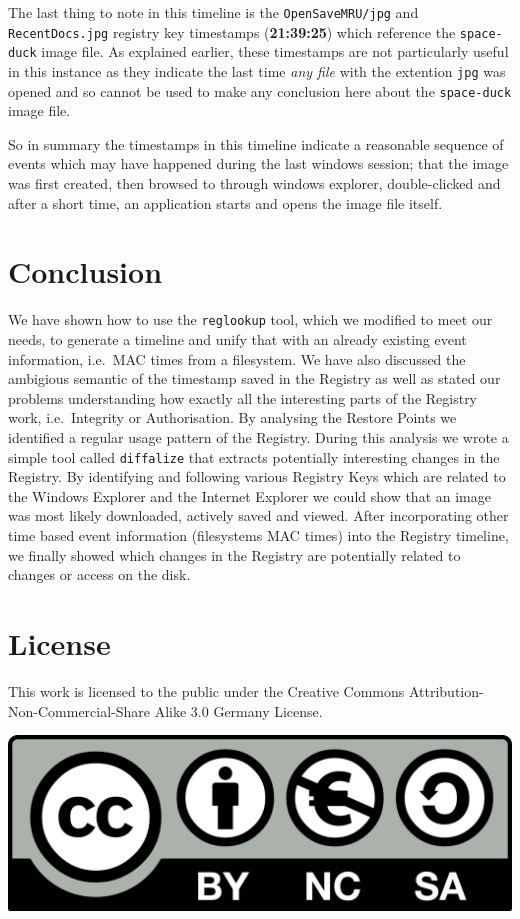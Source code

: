 \documentclass[a4paper,
    11pt,
    normalheadings,
    parindent,
    UKenglish,
    abstracton,
    ]{scrartcl}
\begin{document}
The last thing to note in this timeline is the \texttt{OpenSaveMRU/jpg} and \texttt{RecentDocs.jpg} registry key timestamps (\textbf{21:39:25}) which reference the \texttt{space-duck} image file.
As explained earlier, these timestamps are not particularly useful in this instance as they indicate the last time \emph{any file} with the extention \texttt{jpg} was opened and so cannot be used to make any conclusion here about the \texttt{space-duck} image file.

So in summary the timestamps in this timeline indicate a reasonable sequence of events which may have happened during the last windows session; that the image was first created, then browsed to through windows explorer, double-clicked and after a short time, an application starts and opens the image file itself.


\section{Conclusion}

We have shown how to use the \texttt{reglookup} tool, which we modified to meet our needs, to generate a timeline and unify that with an already existing event information, i.e.\, MAC times from a filesystem.
%
We have also discussed the ambigious semantic of the timestamp saved in the Registry as well as stated our problems understanding how exactly all the interesting parts of the Registry work, i.e.\, Integrity or Authorisation.
%
By analysing the Restore Points we identified a regular usage pattern of the Registry.
%
During this analysis we wrote a simple tool called \texttt{diffalize} that extracts potentially interesting changes in the Registry.
%
By identifying and following various Registry Keys which are related to the Windows Explorer and the Internet Explorer we could show that an image was most likely downloaded, actively saved and viewed.
%
After incorporating other time based event information (filesystems MAC times) into the Registry timeline, we finally showed which changes in the Registry are potentially related to changes or access on the disk.



\section*{License}
This work is licensed to the public under the Creative Commons Attribution-Non-Commercial-Share Alike 3.0 Germany License.
\begin{center}\includegraphics{bin/by-nc-sa-eu.png}\end{center}
\end{document}
